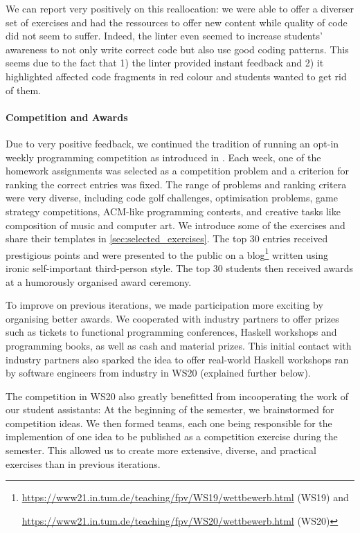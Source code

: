 We can report very positively on this reallocation:
we were able to offer a diverser set of exercises and
had the ressources to offer new content
while quality of code did not seem to suffer.
Indeed, the linter even seemed to increase students' awareness
to not only write correct code but also use good coding patterns.
This seems due to the fact that 1) the linter provided instant feedback and 2) it highlighted affected code fragments in red colour and students wanted to get rid of them.

\paragraph{Competition and Awards}
Due to very positive feedback,
we continued the tradition of running an opt-in weekly
programming competition as introduced in \cite{next_1100}.
Each week, one of the homework assignments
was selected as a competition problem
and a criterion for ranking the correct entries was fixed.
The range of problems and ranking critera were very diverse,
including code golf challenges,
optimisation problems,
game strategy competitions,
ACM-like programming contests,
and creative tasks like composition of music
and computer art.
We introduce some of the exercises and share their templates in \cref{sec:selected_exercises}.
The top 30 entries received prestigious points
and were presented to the public on a blog\footnote{\url{https://www21.in.tum.de/teaching/fpv/WS19/wettbewerb.html} (WS19) and

\url{https://www21.in.tum.de/teaching/fpv/WS20/wettbewerb.html} (WS20)}
written using ironic self-important third-person style.
The top 30 students then received awards at
a humorously organised award ceremony.

To improve on previous iterations,
we made participation more exciting by organising better awards.
We cooperated with industry partners
to offer prizes such as tickets to functional programming conferences,
Haskell workshops and programming books, as well as cash and material prizes.
This initial contact with industry partners
also sparked the idea to offer real-world Haskell workshops
ran by software engineers from industry in WS20 (explained further below).

The competition in WS20 also greatly benefitted from incooperating the work of our student assistants:
At the beginning of the semester,
we brainstormed for competition ideas.
We then formed teams, each one being responsible for the
implemention of one idea to be published as a competition exercise during the semester.
This allowed us to create more extensive, diverse,
and practical exercises than in previous iterations.

